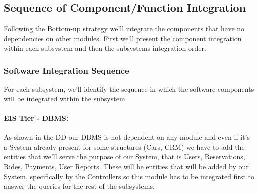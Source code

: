 \documentclass[a4paper]{article}
\begin{document}
\subsection{Sequence of Component/Function Integration}
Following the Bottom-up strategy we'll integrate the components that have no dependencies on other modules. First we'll present the component integration within each subsystem and then the subsystems integration order.
\subsubsection{Software Integration Sequence}
For each subsystem, we'll identify the sequence in which the software components will be integrated within the subsystem.
\paragraph{EIS Tier - DBMS:}
As shown in the DD our DBMS is not dependent on any module and even if it's a System already present for some structures (Cars, CRM) we have to add the entities that we'll serve the purpose of our System, that is Users, Reservations, Rides, Payments, User Reports. These will be entities that will be added by our System, specifically by the Controllers so this module has to be integrated first to answer the queries for the rest of the subsystems.
\end{document}
